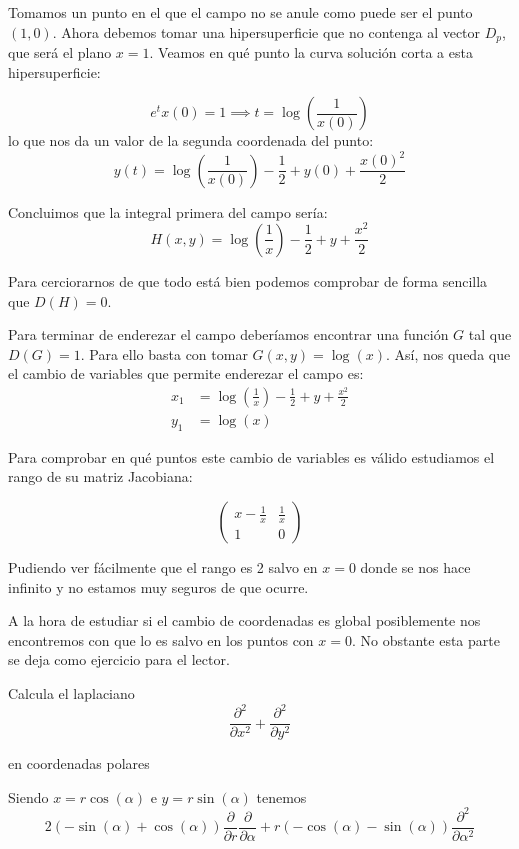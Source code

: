 \begin{problem}[5]
Tomamos un punto en el que el campo no se anule como puede ser el punto $(1,0)$. Ahora debemos tomar una hipersuperficie que no contenga al vector $D_p$, que será el plano $x=1$. Veamos en qué punto la curva solución corta a esta hipersuperficie:

\[e^t x(0)= 1 \implies t = \log\left(\frac{1}{x(0)}\right)\]
lo que nos da un valor de la segunda coordenada del punto:
\[y(t)=\log\left(\frac{1}{x(0)}\right)-\frac{1}{2}+y(0)+\frac{x(0)^2}{2}\]

Concluimos que la integral primera del campo sería:
\[H(x,y)=\log\left(\frac{1}{x}\right)-\frac{1}{2}+y+\frac{x^2}{2}\]

Para cerciorarnos de que todo está bien podemos comprobar de forma sencilla que $D(H)=0$.

Para terminar de enderezar el campo deberíamos encontrar una función $G$ tal que $D(G)=1$. Para ello basta con tomar $G(x,y)=\log(x)$. Así, nos queda que el cambio de variables que permite enderezar el campo es:
\begin{align*}
x_1 &= \log\left(\frac{1}{x}\right)-\frac{1}{2}+y+\frac{x^2}{2} \\
y_1 &= \log(x)
\end{align*}

Para comprobar en qué puntos este cambio de variables es válido estudiamos el rango de su matriz Jacobiana:

\[\left( \begin{array}{cc}
x-\frac{1}{x} & \frac{1}{x}  \\
1 & 0  \end{array} \right)\]

Pudiendo ver fácilmente que el rango es 2 salvo en $x=0$ donde se nos hace infinito y no estamos muy seguros de que ocurre.

A la hora de estudiar si el cambio de coordenadas es global posiblemente nos encontremos con que lo es salvo en los puntos con $x=0$. No obstante esta parte se deja como ejercicio para el lector.
\end{problem}

\begin{problem}[6]
Calcula el laplaciano
\[\frac{\partial^2}{\partial x^2}+\frac{\partial^2}{\partial y^2}\]

en coordenadas polares

\solution
\yoP

Siendo $x=r\cos(α)$ e $y=r\sin(α)$ tenemos
\[2(-\sin(α)+\cos(α))\frac{\partial}{\partial r}\frac{\partial}{\partial α}+r(-\cos(α)-\sin(α))\frac{\partial^2}{\partial α^2}\]
\end{problem}

